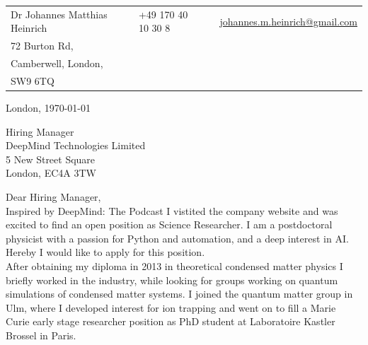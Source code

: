 \documentclass[10pt, a4paper]{class_cover_letter}
\begin{document}

\vspace{-0.8cm}


\begin{center}
\begin{table}[htpb]
\centering
\begin{tabular}{lllll}
 Dr Johannes Matthias Heinrich & \hspace{1.95cm} \textsc{\Large\icon{\Telefon}} & \hspace{0.01cm} +49 170 40 10 30 8 & \hspace{1.45cm} \textsc{\large\icon{@}} & \hspace{0.01cm} \href{mailto:johannes.m.heinrich@gmail.com}{johannes.m.heinrich@gmail.com}\\
72 Burton Rd, &  &  &  &  \\
Camberwell, London,  &  &  &  &  \\
SW9 6TQ &  &  &  & 
\end{tabular}
\end{table}
\end{center}


\hfill London, \today\\

\vspace{0.25cm}

Hiring Manager \\
DeepMind Technologies Limited\\
5 New Street Square\\
London, EC4A 3TW
	      
\vspace{1cm}

Dear Hiring Manager,\\

Inspired by DeepMind: The Podcast I vistited the company website and was excited to find an open position as Science Researcher. I am a postdoctoral physicist with a passion for Python and automation, and a deep interest in AI. Hereby I would like to apply for this position.\\

After obtaining my diploma in 2013 in theoretical condensed matter physics I briefly worked in the industry, while looking for groups working on quantum simulations of condensed matter systems. I joined the quantum matter group in Ulm, where I developed interest for ion trapping and went on to fill a Marie Curie early stage researcher position as PhD student at Laboratoire Kastler Brossel in Paris.\\
\end{document}
